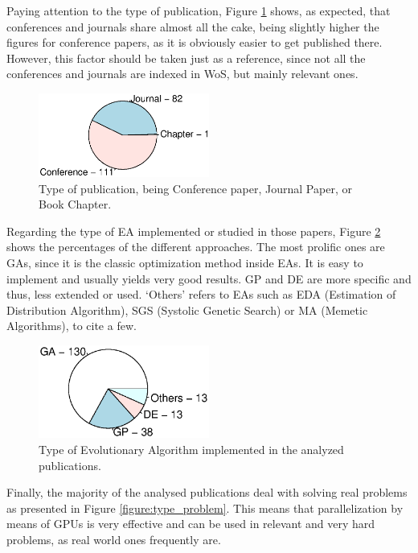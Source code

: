 \documentclass{article}
\begin{document}
Paying attention to the type of publication, Figure \ref{figure:type_publication} shows, as expected, that conferences and journals share almost all the cake, being slightly higher the figures for conference papers, as it is obviously easier to get published there. However, this factor should be taken just as a reference, since not all the conferences and journals are indexed in WoS, but mainly relevant ones.

\begin{figure}[!ht]
\centering
\includegraphics[clip,trim=16 64 16 64,width=0.5\textwidth]{papertype.eps}
\caption{Type of publication, being Conference paper, Journal Paper, or Book Chapter.}
\label{figure:type_publication}
\end{figure}

Regarding the type of EA implemented or studied in those papers, Figure \ref{figure:type_algorithm} shows the percentages of the different approaches. The most prolific ones are GAs, since it is the classic optimization method inside EAs. It is easy to implement and usually yields very good results.  GP and DE are more specific and thus, less extended or used. `Others' refers to EAs such as EDA (Estimation of Distribution Algorithm), SGS (Systolic Genetic Search) or MA (Memetic Algorithms), to cite a few.

\begin{figure}[!ht]
\centering
\includegraphics[clip,trim=16 64 16 64,width=0.5\textwidth]{algorithmtype.eps}
\caption{Type of Evolutionary Algorithm implemented in the analyzed publications.}
\label{figure:type_algorithm}
\end{figure}

Finally, the majority of the analysed publications deal with solving real problems as  presented in Figure \ref{figure:type_problem}. This means that parallelization by means of GPUs is very effective and can be used in relevant and very hard problems, as real world ones frequently are.
\end{document}
